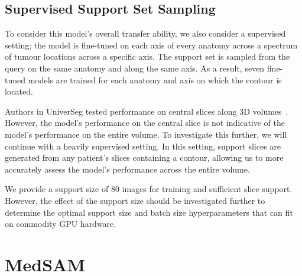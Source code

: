 \documentclass[11pt,twoside]{report}
\begin{document}


\subsection{Supervised Support Set Sampling}

To consider this model's overall transfer ability, we also consider a supervised setting; the model is fine-tuned on each axis of every anatomy across a spectrum of tumour locations across a specific axis. The support set is sampled from the query on the same anatomy and along the same axis. As a result, seven fine-tuned models are trained for each anatomy and axis on which the contour is located.

Authors in UniverSeg tested performance on central slices along 3D volumes~\cite{universeg}. However, the model's performance on the central slice is not indicative of the model's performance on the entire volume. To investigate this further, we will continue with a heavily supervised setting. In this setting, support slices are generated from any patient's slices containing a contour, allowing us to more accurately assess the model's performance across the entire volume. 

We provide a support size of 80 images for training and sufficient slice support. However, the effect of the support size should be investigated further to determine the optimal support size and batch size hyperparameters that can fit on commodity GPU hardware.

\section{MedSAM}
\end{document}
